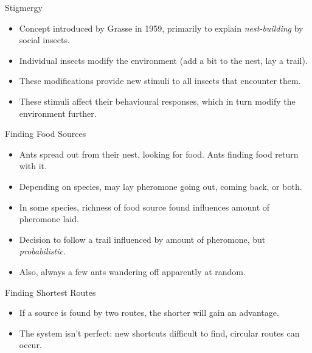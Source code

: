 \documentclass{article}
\begin{document}
\begin{slide}{}
{\Large Stigmergy}
\begin{itemize}
\item Concept introduced by Grasse in 1959, primarily to explain {\em
nest-building} by social insects.
\item Individual insects modify the environment (add a bit to the nest,
lay a trail).
\item These modifications provide new stimuli to all insects that
encounter them.
\item These stimuli affect their behavioural responses, which in turn
modify the environment further.
\end{itemize}
\end{slide}

\begin{slide}{}
{\Large Finding Food Sources}
\begin{itemize}
\item Ants spread out from their nest,
looking for food. Ants finding food return with it. 
\item Depending on species, may lay pheromone going out, coming back,
or both.
\item In some species, richness of food source found influences amount
of pheromone laid.
\item Decision to follow a trail influenced by amount of pheromone,
but {\em probabilistic}.
\item Also, always a few ants wandering off apparently at random.
\end{itemize}
\end{slide}

\begin{slide}{}
{\Large Finding Shortest Routes}
\begin{itemize}
\item If a source is found by two routes, the shorter will gain an advantage.
\item The system isn't perfect: new shortcuts difficult to find,
circular routes can occur.
\end{itemize}
\begin{center}


\end{center}

\end{slide}
\end{document}
